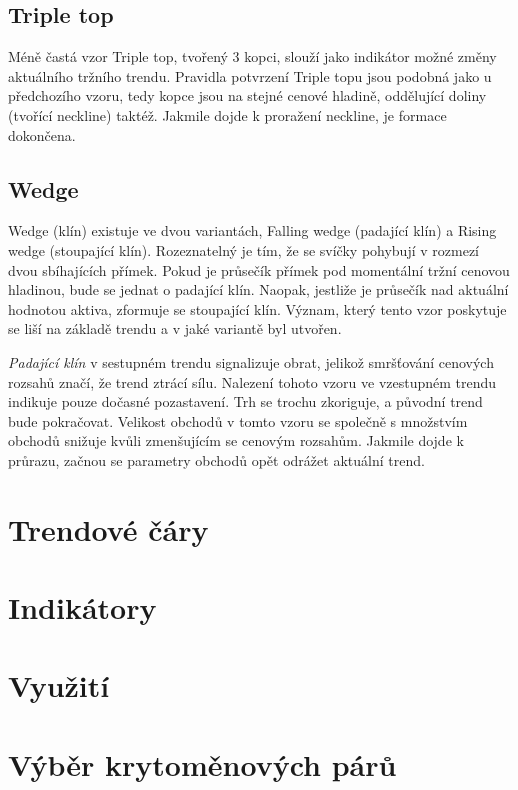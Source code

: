 \subsection{Triple top}
Méně častá vzor Triple top, tvořený 3 kopci, slouží jako indikátor možné změny aktuálního tržního trendu. Pravidla potvrzení Triple topu jsou podobná jako u předchozího vzoru, tedy
kopce jsou na stejné cenové hladině, oddělující doliny (tvořící neckline) taktéž. Jakmile dojde k proražení neckline, je formace dokončena. \iffalse TODO: Pridat \ref{} na obrazek \fi


\subsection{Wedge}
Wedge (klín) existuje ve dvou variantách, Falling wedge (padající klín) a Rising wedge (stoupající klín). Rozeznatelný je tím, že se svíčky pohybují v rozmezí dvou sbíhajících přímek.
Pokud je průsečík přímek pod momentální tržní cenovou hladinou, bude se jednat o padající klín. Naopak, jestliže je průsečík nad aktuální hodnotou aktiva, zformuje se stoupající klín.
Význam, který tento vzor poskytuje se liší na základě trendu a v jaké variantě byl utvořen.

\emph{Padající klín} v sestupném trendu signalizuje obrat, jelikož smršťování cenových rozsahů značí, že trend ztrácí sílu. Nalezení tohoto vzoru ve vzestupném trendu indikuje pouze
dočasné pozastavení. Trh se trochu zkoriguje, a původní trend bude pokračovat. Velikost obchodů v tomto vzoru se společně s množstvím obchodů snižuje kvůli zmenšujícím se cenovým
rozsahům. Jakmile dojde k průrazu, začnou se parametry obchodů opět odrážet aktuální trend. \iffalse TODO: Pridat \ref{} na obrazek \fi




\section{Trendové čáry}
\label{sec:TrendingLines}


\section{Indikátory}
\label{sec:Indicators}

\section{Využití}

\section{Výběr krytoměnových párů}
\label{sec:ChoosingCryptopairs}

\endinput